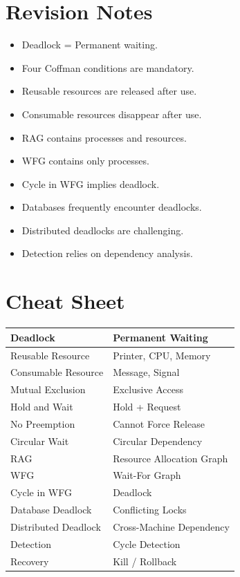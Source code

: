 \section{Revision Notes}

\begin{itemize}
\item Deadlock = Permanent waiting.
\item Four Coffman conditions are mandatory.
\item Reusable resources are released after use.
\item Consumable resources disappear after use.
\item RAG contains processes and resources.
\item WFG contains only processes.
\item Cycle in WFG implies deadlock.
\item Databases frequently encounter deadlocks.
\item Distributed deadlocks are challenging.
\item Detection relies on dependency analysis.
\end{itemize}

\section{Cheat Sheet}

\begin{center}
\begin{tabular}{|p{5cm}|p{8cm}|}
\hline
Deadlock & Permanent Waiting \\
\hline
Reusable Resource & Printer, CPU, Memory \\
\hline
Consumable Resource & Message, Signal \\
\hline
Mutual Exclusion & Exclusive Access \\
\hline
Hold and Wait & Hold + Request \\
\hline
No Preemption & Cannot Force Release \\
\hline
Circular Wait & Circular Dependency \\
\hline
RAG & Resource Allocation Graph \\
\hline
WFG & Wait-For Graph \\
\hline
Cycle in WFG & Deadlock \\
\hline
Database Deadlock & Conflicting Locks \\
\hline
Distributed Deadlock & Cross-Machine Dependency \\
\hline
Detection & Cycle Detection \\
\hline
Recovery & Kill / Rollback \\
\hline
\end{tabular}
\end{center}